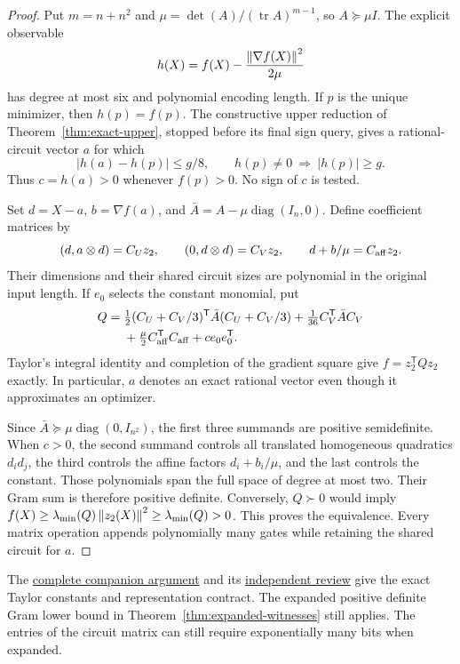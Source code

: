 \begin{proof}
Put $m=n+n^2$ and $\mu=\det(A)/(\operatorname{tr}A)^{m-1}$, so
$A\succeq\mu I$. The explicit observable
\[
 h(X)=f(X)-\frac{\left\lVert\nabla f(X)\right\rVert^2}{2\mu}
\]
has degree at most six and polynomial encoding length. If $p$ is the unique
minimizer, then $h(p)=f(p)$. The constructive upper reduction of
Theorem~\ref{thm:exact-upper}, stopped before its final sign query, gives a
rational-circuit vector $a$ for which
\[
 |h(a)-h(p)|\le g/8,
 \qquad h(p)\ne0\ \Longrightarrow\ |h(p)|\ge g.
\]
Thus $c=h(a)>0$ whenever $f(p)>0$. No sign of $c$ is tested.

Set $d=X-a$, $b=\nabla f(a)$, and
$\bar A=A-\mu\operatorname{diag}(I_n,0)$. Define coefficient matrices by
\[
 (d,a\otimes d)=C_Uz_2,\qquad
 (0,d\otimes d)=C_Vz_2,\qquad
 d+b/\mu=C_{\rm aff}z_2.
\]
Their dimensions and their shared circuit sizes are polynomial in the
original input length. If $e_0$ selects the constant monomial, put
\begin{align*}
 Q={}&\tfrac12(C_U+C_V/3)^{\mathsf T}\bar A(C_U+C_V/3)
       +\tfrac1{36}C_V^{\mathsf T}\bar A C_V\\
    &+\tfrac\mu2 C_{\rm aff}^{\mathsf T}C_{\rm aff}
       +c e_0e_0^{\mathsf T}.
\end{align*}
Taylor's integral identity and completion of the gradient square give
$f=z_2^{\mathsf T}Qz_2$ exactly. In particular, $a$ denotes an exact
rational vector even though it approximates an optimizer.

Since $\bar A\succeq\mu\operatorname{diag}(0,I_{n^2})$, the first
three summands are positive semidefinite. When $c>0$, the second summand
controls all translated homogeneous quadratics $d_id_j$, the third controls
the affine factors $d_i+b_i/\mu$, and the last controls the constant.
Those polynomials span the full space of degree at most two. Their Gram
sum is therefore positive definite. Conversely, $Q\succ0$ would imply
$f(X)\ge\lambda_{\min}(Q)\left\lVert z_2(X)\right\rVert^2\ge\lambda_{\min}(Q)>0$.
This proves the equivalence. Every matrix operation appends polynomially
many gates while retaining the shared circuit for $a$.
\end{proof}

The \href{../reviews/exact-core/general-degree/circuit-interior-gram.md}{complete
companion argument} and its
\href{../reviews/exact-core/general-degree/circuit-interior-gram-review.md}{independent
review} give the exact Taylor constants and representation contract.
The expanded positive definite Gram lower bound in
Theorem~\ref{thm:expanded-witnesses} still applies. The entries of the
circuit matrix can still require exponentially many bits when expanded.


